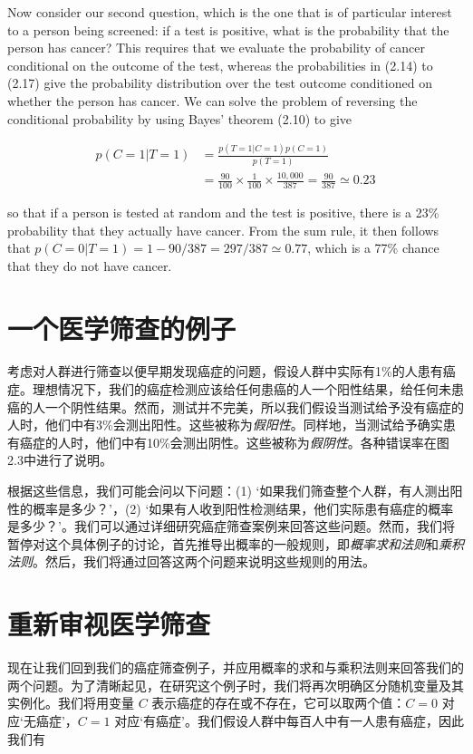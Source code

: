 \documentclass{article}
\begin{document}
Now consider our second question, which is the one that is of particular interest to a person being screened: if a test is positive, what is the probability that the person has cancer? This requires that we evaluate the probability of cancer conditional on the outcome of the test, whereas the probabilities in (2.14) to (2.17) give the probability distribution over the test outcome conditioned on whether the person has cancer. We can solve the problem of reversing the conditional probability by using Bayes' theorem (2.10) to give

\begin{align}
p(C=1|T=1) &= \frac{p(T=1|C=1)p(C=1)}{p(T=1)} \tag{2.21} \\
&= \frac{90}{100}\times\frac{1}{100}\times\frac{10,000}{387}=\frac{90}{387}\simeq 0.23 \tag{2.22}
\end{align}

so that if a person is tested at random and the test is positive, there is a 23\% probability that they actually have cancer. From the sum rule, it then follows that $p(C=0|T=1)=1-90/387=297/387\simeq 0.77$, which is a 77\% chance that they do not have cancer.



\section{一个医学筛查的例子}

考虑对人群进行筛查以便早期发现癌症的问题，假设人群中实际有1\%的人患有癌症。理想情况下，我们的癌症检测应该给任何患癌的人一个阳性结果，给任何未患癌的人一个阴性结果。然而，测试并不完美，所以我们假设当测试给予没有癌症的人时，他们中有3\%会测出阳性。这些被称为\textit{假阳性}。同样地，当测试给予确实患有癌症的人时，他们中有10\%会测出阴性。这些被称为\textit{假阴性}。各种错误率在图2.3中进行了说明。

根据这些信息，我们可能会问以下问题：(1) ‘如果我们筛查整个人群，有人测出阳性的概率是多少？’，(2) ‘如果有人收到阳性检测结果，他们实际患有癌症的概率是多少？’。我们可以通过详细研究癌症筛查案例来回答这些问题。然而，我们将暂停对这个具体例子的讨论，首先推导出概率的一般规则，即\textit{概率求和法则}和\textit{乘积法则}。然后，我们将通过回答这两个问题来说明这些规则的用法。

\section{重新审视医学筛查}

现在让我们回到我们的癌症筛查例子，并应用概率的求和与乘积法则来回答我们的两个问题。为了清晰起见，在研究这个例子时，我们将再次明确区分随机变量及其实例化。我们将用变量 $C$ 表示癌症的存在或不存在，它可以取两个值：$C = 0$ 对应‘无癌症’，$C = 1$ 对应‘有癌症’。我们假设人群中每百人中有一人患有癌症，因此我们有
\end{document}
